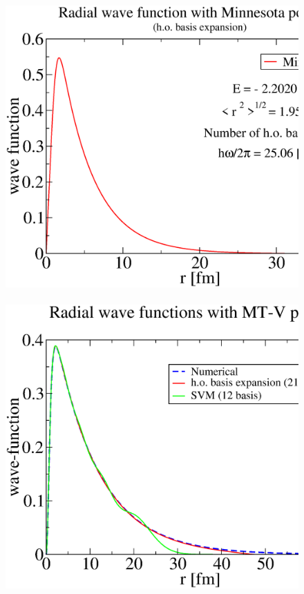\documentclass[12pt,a4paper,titlepage]{jarticle}
\begin{document}
\begin{figure}[H]
\begin{center}
\includegraphics[width=140mm,height=110mm]{wf_ho4.eps}
\end{center}
\end{figure}

\begin{figure}[H]
\begin{center}
\includegraphics[width=140mm,height=110mm]{wave-fcts1.eps}
\end{center}
\end{figure}
\end{document}
